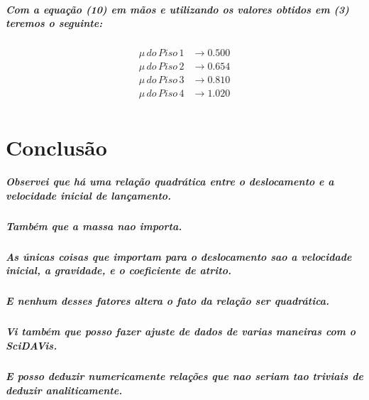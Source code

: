 \documentclass[12pt,twoside, a4paper, twocolumn]{article}
\begin{document}
\subparagraph*{Com a equação (10) em mãos e utilizando os valores obtidos em (3) teremos o seguinte:}

\begin{equation}
    \begin{aligned}
        \mu \, do \, Piso\, 1 & \rightarrow 0.500 \\
        \mu \, do \, Piso\, 2 & \rightarrow 0.654 \\
        \mu \, do \, Piso\, 3 & \rightarrow 0.810 \\
        \mu \, do \, Piso\, 4 & \rightarrow 1.020 \\
    \end{aligned}
\end{equation}

\section{Conclusão}

\subparagraph*{Observei que há uma relação quadrática entre o deslocamento e a velocidade inicial de lançamento.   }

\subparagraph*{Também que a massa nao importa.}

\subparagraph*{As únicas coisas que importam para o deslocamento sao a velocidade inicial, a gravidade, e o coeficiente de atrito.}

\subparagraph*{E nenhum desses fatores altera o fato da relação ser quadrática.}

\subparagraph*{Vi também que posso fazer ajuste de dados de varias maneiras com o SciDAVis.}

\subparagraph*{E posso deduzir numericamente relações que nao seriam tao triviais de deduzir analiticamente.}
\end{document}
